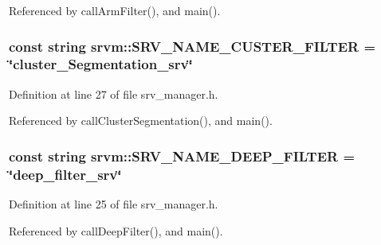 Referenced by call\-Arm\-Filter(), and main().

\hypertarget{namespacesrvm_af1af7e755b5eb874d7bc4fec3d6585b2}{
\subsubsection[{S\-R\-V\-\_\-\-N\-A\-M\-E\-\_\-\-C\-U\-S\-T\-E\-R\-\_\-\-F\-I\-L\-T\-E\-R}]{\setlength{\rightskip}{0pt plus 5cm}const string srvm\-::\-S\-R\-V\-\_\-\-N\-A\-M\-E\-\_\-\-C\-U\-S\-T\-E\-R\-\_\-\-F\-I\-L\-T\-E\-R = \char`\"{}cluster\-\_\-\-Segmentation\-\_\-srv\char`\"{}}}\label{namespacesrvm_af1af7e755b5eb874d7bc4fec3d6585b2}


Definition at line 27 of file srv\-\_\-manager.\-h.



Referenced by call\-Cluster\-Segmentation(), and main().

\hypertarget{namespacesrvm_aef26ae8da6e703be7bbc1fc319fc18d5}{
\subsubsection[{S\-R\-V\-\_\-\-N\-A\-M\-E\-\_\-\-D\-E\-E\-P\-\_\-\-F\-I\-L\-T\-E\-R}]{\setlength{\rightskip}{0pt plus 5cm}const string srvm\-::\-S\-R\-V\-\_\-\-N\-A\-M\-E\-\_\-\-D\-E\-E\-P\-\_\-\-F\-I\-L\-T\-E\-R = \char`\"{}deep\-\_\-filter\-\_\-srv\char`\"{}}}\label{namespacesrvm_aef26ae8da6e703be7bbc1fc319fc18d5}


Definition at line 25 of file srv\-\_\-manager.\-h.



Referenced by call\-Deep\-Filter(), and main().

